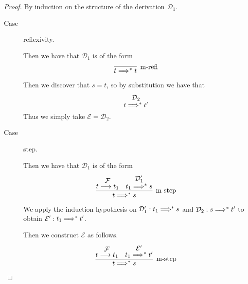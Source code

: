 \documentclass[11pt,letterpaper]{article}
\begin{document}
\begin{proof}
    By induction on the structure of the derivation $\mathcal{D}_1$.

    \begin{description}
        \item[Case] reflexivity.

            Then we have that $\mathcal{D}_1$ is of the form
            \begin{equation*}
                \infer[\text{m-refl}]{t \altevalto^* t}{}
            \end{equation*}

            Then we discover that $s = t$,
            so by substitution we have that
            \begin{equation*}
                \deduce[\mathcal{D}_2]{t \altevalto^* t^\prime}{}
            \end{equation*}
            Thus we simply take $\mathcal{E} = \mathcal{D}_2$.

        \item[Case] step.

            Then we have that $\mathcal{D}_1$ is of the form
            \begin{equation*}
                \infer[\text{m-step}]{
                    t \altevalto^* s
                }{
                    \deduce[\mathcal{F}]{t \evalto t_1}{}
                    &
                    \deduce[\mathcal{D}_1^\prime]{t_1 \altevalto^* s}{}
                }
            \end{equation*}

            We apply the induction hypothesis on
            $\mathcal{D}_1^\prime : t_1 \Longrightarrow^* s$
            and
            $\mathcal{D}_2 : s \Longrightarrow^* t^\prime$
            to obtain
            $\mathcal{E}^\prime : t_1 \Longrightarrow^* t^\prime$.

            Then we construct $\mathcal{E}$ as follows.
            \begin{equation*}
                \infer[\text{m-step}]{
                    t \altevalto^* s
                }{
                    \deduce[\mathcal{F}]{t \evalto t_1}{}
                    &
                    \deduce[\mathcal{E}^\prime]{t_1 \altevalto^* t^\prime}{}
                }
            \end{equation*}
    \end{description}
\end{proof}
\end{document}
